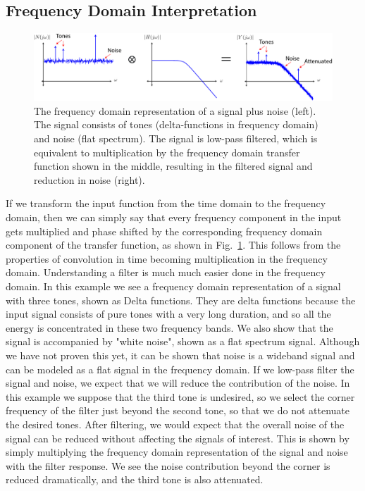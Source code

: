 \subsection{Frequency Domain Interpretation}
\begin{figure}[tb]
\centering
\includegraphics[width=\columnwidth]{sig_noise_freq.pdf}
\caption{The frequency domain representation of a signal plus noise (left).  The signal consists of tones (delta-functions in frequency domain) and noise (flat spectrum).  The signal is low-pass filtered, which is equivalent to multiplication by the frequency domain transfer function shown in the middle, resulting in the filtered signal and reduction in noise (right).} \label{fig:freq_domain}
\end{figure}
If we transform the input function from the time domain to the frequency domain, then we can simply say that every frequency component in the input gets multiplied and phase shifted by the corresponding frequency domain component of the transfer function, as shown in Fig.~\ref{fig:freq_domain}.  This follows from the properties of convolution in time becoming multiplication in the frequency domain.  Understanding a filter is much much easier done in the frequency domain.  In this example we see a frequency domain representation of a signal with three tones, shown as Delta functions.  They are delta functions because the input signal consists of pure tones with a very long duration, and so all the energy is concentrated in these two frequency bands.  We also show that the signal is accompanied by "white noise", shown as a flat spectrum signal.  Although we have not proven this yet, it can be shown that noise is a wideband signal and can be modeled as a flat signal in the frequency domain.
If we low-pass filter the signal and noise, we expect that we will reduce the contribution of the noise.  In this example we suppose that the third tone is undesired, so we select the corner frequency of the filter just beyond the second tone, so that we do not attenuate the desired tones.  After filtering,   we would expect that the overall noise of the signal can be reduced without affecting the signals of interest.  This is shown by simply multiplying the frequency domain representation of the signal and noise with the filter response.  We see the noise contribution beyond the corner is reduced dramatically, and the third tone is also attenuated.
